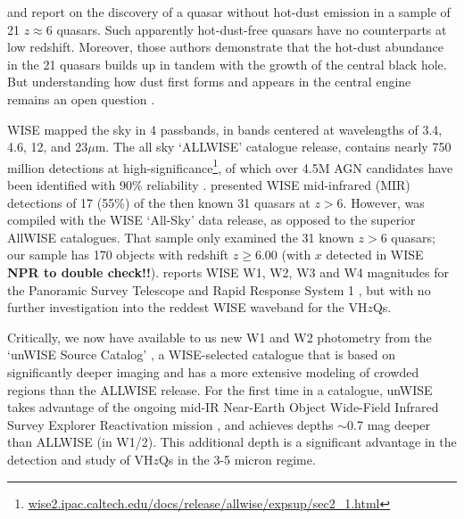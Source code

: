 \documentclass[usenatbib]{mnras}
\begin{document}
\citet{Jiang2006dust} and \citet{Jiang2010} report on the discovery of a quasar without hot-dust emission in a sample of 21 $z\approx6$ quasars. Such apparently hot-dust-free quasars have no counterparts at low redshift. Moreover, those authors demonstrate that the hot-dust abundance in the 21 quasars builds up in tandem with the growth of the central black hole. But understanding how dust first forms and appears in the central engine remains an open question \citep{WangR2008, WangR2011}.

WISE mapped the sky in 4 passbands, in bands centered at wavelengths of 3.4, 4.6, 12, and 23$\mu$m. The all sky `ALLWISE' catalogue release, contains nearly 750 million detections at high-significance\footnote{\href{wise2.ipac.caltech.edu/docs/release/allwise/expsup/sec2\_1.html}{wise2.ipac.caltech.edu/docs/release/allwise/expsup/sec2\_1.html}}, of which over 4.5M AGN candidates have been identified with 90\% reliability \citep{Assef2018}.  \citet{Blain2013} presented WISE mid-infrared (MIR) detections of 17 (55\%) of the then known 31 quasars at $z > 6$. However, \citet{Blain2013} was compiled with the WISE `All-Sky' data release, as opposed to the superior AllWISE catalogues. That sample only examined the 31 known $z>6$ quasars; our sample has 170 objects with redshift $z \geq 6.00$ (with $x$ detected in WISE {\bf NPR to double check!!}). \citet{Banados2016} reports WISE W1, W2, W3 and W4 magnitudes for the Panoramic Survey Telescope and Rapid Response System 1 \citep[Pan-STARRS1, PS1;][]{Kaiser2002, Kaiser2010}, but with no further investigation into the reddest WISE waveband for the VH$z$Qs.

Critically, we now have available to us new W1 and W2 photometry from the `unWISE Source Catalog' \citep[][]{Schlafly_Meisner2018}, a WISE-selected catalogue that is based on significantly deeper imaging and has a more extensive modeling of crowded regions than the ALLWISE release. For the first time in a catalogue, unWISE takes advantage of the ongoing mid-IR Near-Earth Object Wide-Field Infrared Survey Explorer Reactivation mission \citep[NEOWISE-R; ][]{Mainzer2014}, and achieves depths $\sim$0.7 mag deeper than ALLWISE (in W1/2).  This additional depth is a significant advantage in the detection and study of VH$z$Qs in the 3-5 micron regime.
\end{document}
